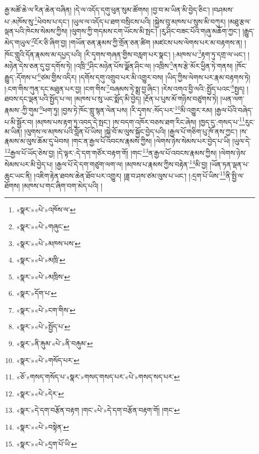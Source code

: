 རྒྱ་མཚོ་ཆེ་ལ་རིན་ཆེན་བཞིན། །དེ་ལ་འདོད་དགུ་ཕུན་སུམ་ཚོགས། །བྱ་བ་མ་ཡིན་མི་བྱེད་ཅིང་། །བཤམས་པ་:མཁོས་སུ་\footnote{«སྣར་»«པེ་»འཁོས་ལ་}ཕེབས་པ་དང་། །ཡུལ་ལ་འདོད་པ་ཐག་བསྲིངས་པའི། །སྐྱེས་བུ་མཁས་པ་སུས་མི་བཀུར། །མཐུ་རྩལ་ལྡན་པའི་ཁེངས་སེམས་ཀྱིས། །ལུགས་ཀྱི་གདམས་ངག་ཡོངས་མི་སྤང་། །རུ་ཤིང་བཟང་པོའི་གཞུ་མཆོག་ཀྱང་། །རྒྱུད་མེད་གཡུལ་\footnote{«སྣར་»«པེ་»གཞུང་}ངོར་ཅི་ཞིག་བྱ། །གཡོན་ཅན་རྣམས་ཀྱི་གྲོན་ཅན་ཚིག །མཛངས་པས་ལེགས་པར་མ་བརྟགས་ན། །ཁོང་གླུའི་དོན་རྣམས་མ་དཔྱད་པའི། །རི་དྭགས་གཞན་གྱིས་བརླག་པར་སྣང་། །:མཁས་པ་\footnote{«སྣར་»«པེ་»མཁས་པས་}རྟག་ཏུ་དགྲ་ལ་ཡང་། །མཉེན་དེས་ཅན་དུ་བྱ་དགོས་ཏེ། །འཁྲི་\footnote{«སྣར་»«པེ་»མཁྲི་}ཤིང་མཉེན་པོས་ལྗོན་ཤིང་ལ། །འཁྲིས་\footnote{«སྣར་»«པེ་»མཁྲིས་}ནས་རྩེ་མོར་ཕྱིན་ཏེ་གནས། །ཁོང་རྒྱུད་:དོགས་པ་\footnote{«སྣར་»དོག་པ་}ཙམ་གྱིས་འདིར། །དགོས་དགུ་འགྲུབ་པར་མི་འགྱུར་བས། །ཡིད་ཀྱིས་ལེགས་པར་རྣམ་བརྟགས་ཏེ། །:ངག་གིས་ཀུན་དང་མཐུན་པར་བྱ། །ངག་གིས་\footnote{«སྣར་»«པེ་»ངག་གིས་}བཞམས་ཏེ་སྨྲ་བྱ་ཞིང་། །རེས་འགའ་བྱི་ལའི་:སྤྱོད་པའང་\footnote{«སྣར་»«པེ་»སྤྱོད་པ་}སྤྱད། །ཐབས་དང་ལྡན་པའི་སྤྱོད་པ་ལ། །མཁས་པ་སུ་ཡང་སྨོད་མི་བྱེད། །རྔོན་པ་པུས་མོ་གཉིས་བཙུགས་ཏེ། །ཡན་ལག་རྣམས་:ཀྱི་གུམ་\footnote{«སྣར་»ནི་རྐུམ་«པེ་»ནི་བརྐུམ་}ཕག་ཏུ། །བྱས་ཏེ་ཁོང་གླུ་སྙན་ལེན་པས། །རི་དྭགས་:སོད་པར་\footnote{«སྣར་»«པེ་»གསོད་པར་}མི་འགྱུར་རམ། །རྒྱལ་པོའི་བཞེད་པ་མི་སྦྱོར་བ། །མཁས་པས་རྟག་ཏུ་འབད་དེ་སྤང་། །ས་བདག་འཁོར་བཅས་ཐག་རིང་ཞེས། །ཁྱད་དུ་:གསད་པ་\footnote{«ཅོ་»གསད་གསོད་པ་«སྣར་»གསད་གསད་པར་«པེ་»གསད་སད་པར་}རུང་མ་ཡིན། །ལུགས་ལ་མཁས་པའི་བློན་པོ་ཡིས། །སྐྱེ་བོ་མ་ལུས་སྐྱོང་བྱེད་པའི། །རྒྱལ་པོ་གཅིག་པུ་ཁོ་ནས་ཀྱང་། །ས་རྣམས་མ་ལུས་ཆོམ་དུ་ཕེབས། །གང་ན་རྒྱལ་པོ་འབངས་རྣམས་ཀྱིས། །ལེགས་ཉེས་སེམས་པར་བྱེད་པ་ཡི། །ཡུལ་དེ་\footnote{«སྣར་»«པེ་»དེར་}རྒྱལ་པོ་ཡོད་ཅེས་བྱ། །དེ་ལྟར་:དེ་དག་གཙོར་བརྟག་གོ། །གང་\footnote{«སྣར་»དེ་དག་བརྩོན་བརྟག །གང་«པེ་»དེ་དག་བརྩོན་བརྟག་གོ། །གང་}ན་རྒྱལ་པོ་འབངས་རྣམས་ཀྱིས། །ལེགས་ཉེས་སེམས་པར་མི་བྱེད་པ། །རྒྱལ་པོ་དེ་དག་གཙུག་ལག་ལ། །མཁས་པ་རྣམས་ཀྱིས་བརྟེན་\footnote{«སྣར་»«པེ་»བསྟེན་}མི་བྱ། །ཡོན་ཏན་ལྡན་པ་ཆུང་ཡང་ནི། །འཇིག་རྟེན་ཐབས་ཆེན་ཐོབ་པར་འགྱུར། །ཟླ་བ་ཤས་ཙམ་ལུས་པ་ཡང་། །:དྲག་པོ་ཡིས་\footnote{«སྣར་»«པེ་»དྲག་པོ་ཡི་}ནི་སྤྱི་ལ་ཐོགས། །མཁས་པ་གང་ཞིག་བག་མེད་པའི། །
